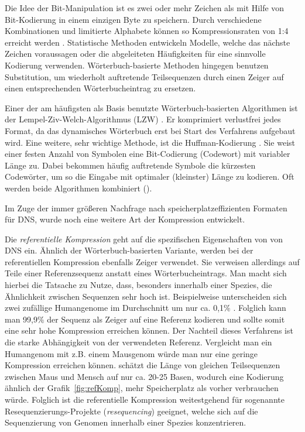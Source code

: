 \documentclass[12pt]{article}
\begin{document}
Die Idee der Bit-Manipulation ist es zwei oder mehr Zeichen als mit Hilfe von Bit-Kodierung in einem einzigen Byte zu speichern. Durch verschiedene Kombinationen und limitierte Alphabete können so Kompressionsraten von 1:4 erreicht werden \cite{rani14new}. Statistische Methoden entwickeln Modelle, welche das nächste Zeichen voraussagen oder die abgeleiteten Häufigkeiten für eine sinnvolle Kodierung verwenden. Wörterbuch-basierte Methoden hingegen benutzen Substitution, um wiederholt auftretende Teilsequenzen durch einen Zeiger auf einen entsprechenden Wörterbucheintrag zu ersetzen. 

Einer der am häufigsten als Basis benutzte Wörterbuch-basierten Algorithmen ist der Lempel-Ziv-Welch-Algorithmus (LZW) \cite{Ziv77auniversal}. Er komprimiert verlustfrei jedes Format, da das dynamisches Wörterbuch erst bei Start des Verfahrens aufgebaut wird. Eine weitere, sehr wichtige Methode, ist die Huffman-Kodierung \cite{huffman}. Sie weist einer festen Anzahl von Symbolen eine Bit-Codierung (Codewort) mit variabler Länge zu. Dabei bekommen häufig auftretende Symbole die kürzesten Codewörter, um so die Eingabe mit optimaler (kleinster) Länge zu kodieren. Oft werden beide Algorithmen kombiniert (\cite{software:gzip}).

Im Zuge der immer größeren Nachfrage nach speicherplatzeffizienten Formaten für DNS, wurde noch eine weitere Art der Kompression entwickelt.

Die \emph{referentielle Kompression} geht auf die spezifischen Eigenschaften von von DNS ein. Ähnlich der Wörterbuch-basierten Variante, werden bei der referentiellen Kompression ebenfalls Zeiger verwendet. Sie verweisen allerdings auf Teile einer Referenzsequenz anstatt eines Wörterbucheintrags. Man macht sich hierbei die Tatsache zu Nutze, dass, besonders innerhalb einer Spezies, die Ähnlichkeit zwischen Sequenzen sehr hoch ist. Beispielweise unterscheiden sich zwei zufällige Humangenome im Durchschnitt um nur ca. 0,1$\%$ \cite{Venter16022001}. Folglich kann man 99,9$\%$ der Sequenz als Zeiger auf eine Referenz kodieren und sollte somit eine sehr hohe Kompression erreichen können. Der Nachteil dieses Verfahrens ist die starke Abhängigkeit von der verwendeten Referenz. Vergleicht man ein Humangenom mit z.B. einem Mausgenom würde man nur eine geringe Kompression erreichen können. \cite{wandelt14trends} schätzt die Länge von gleichen Teilsequenzen zwischen Maus und Mensch auf nur ca. 20-25 Basen, wodurch eine Kodierung ähnlich der Grafik~\ref{fig:refKomp}, mehr Speicherplatz als vorher verbrauchen würde. Folglich ist die referentielle Kompression weitestgehend für sogenannte Resequenzierungs-Projekte (\textit{resequencing}) geeignet, welche sich auf die Sequenzierung von Genomen innerhalb einer Spezies konzentrieren. \\
\end{document}
